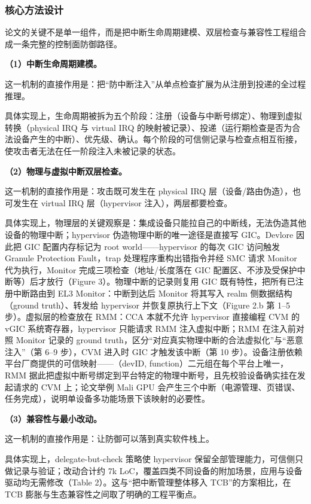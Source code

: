 \documentclass[11pt]{ctexart}
\begin{document}
\subsubsection{核心方法设计}
论文的关键不是单一组件，而是把中断生命周期建模、双层检查与兼容性工程组合成一条完整的控制面防御路径。\par
\noindent\textbf{（1）中断生命周期建模。}\par
这一机制的直接作用是：把“防中断注入”从单点检查扩展为从注册到投递的全过程推理。\par
具体实现上，生命周期被拆为五个阶段：注册（设备与中断号绑定）、物理到虚拟转换（physical IRQ 与 virtual IRQ 的映射被记录）、投递（运行期检查是否为合法设备产生的中断）、优先级、确认。每个阶段的可信侧记录与检查点相互衔接，使攻击者无法在任一阶段注入未被记录的状态。\par
\noindent\textbf{（2）物理与虚拟中断双层检查。}\par
这一机制的直接作用是：攻击既可发生在 physical IRQ 层（设备/路由伪造），也可发生在 virtual IRQ 层（hypervisor 注入），两层都要检查。\par
具体实现上，物理层的关键观察是：集成设备只能拉自己的中断线，无法伪造其他设备的物理中断；hypervisor 伪造物理中断的唯一途径是直接写 GIC。Devlore 因此把 GIC 配置内存标记为 root world——hypervisor 的每次 GIC 访问触发 Granule Protection Fault，trap 处理程序重构出错指令并经 SMC 请求 Monitor 代为执行，Monitor 完成三项检查（地址/长度落在 GIC 配置区、不涉及受保护中断等）后才放行（Figure 3）。物理中断的记录则复用 GIC 既有特性，把所有已注册中断路由到 EL3 Monitor：中断到达后 Monitor 将其写入 realm 侧数据结构（ground truth）、转发给 hypervisor 并恢复原执行上下文（Figure 2.b 第 1--5 步）。虚拟层的检查放在 RMM：CCA 本就不允许 hypervisor 直接编程 CVM 的 vGIC 系统寄存器，hypervisor 只能请求 RMM 注入虚拟中断；RMM 在注入前对照 Monitor 记录的 ground truth，区分“对应真实物理中断的合法虚拟化”与“恶意注入”（第 6--9 步），CVM 进入时 GIC 才触发该中断（第 10 步）。设备注册依赖平台厂商提供的可信映射——（devID, function）二元组在每个平台上唯一，RMM 据此把虚拟中断号绑定到平台特定的物理中断号，且先校验设备确实挂在发起请求的 CVM 上；论文举例 Mali GPU 会产生三个中断（电源管理、页错误、任务完成），说明单设备多功能场景下该映射的必要性。\par
\noindent\textbf{（3）兼容性与最小改动。}\par
这一机制的直接作用是：让防御可以落到真实软件栈上。\par
具体实现上，delegate-but-check 策略使 hypervisor 保留全部管理能力，可信侧只做记录与验证；改动合计约 7k LoC，覆盖四类不同设备的附加场景，应用与设备驱动均无需修改（Table 2）。这与“把中断管理整体移入 TCB”的方案相比，在 TCB 膨胀与生态兼容性之间取了明确的工程平衡点。\par
\end{document}
